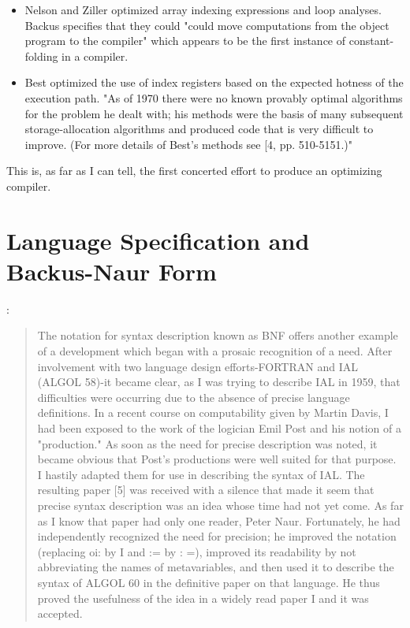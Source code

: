 \begin{itemize}
    \item Nelson and Ziller optimized array indexing expressions and loop analyses.
          Backus specifies that they could "could move computations from the object program to the compiler"
          which appears to be the first instance of constant-folding in a compiler.
    \item Best optimized the use of index registers based on the expected hotness of the execution path.
            "As of 1970 there were no known provably optimal algorithms for the problem 
            he dealt with; his methods were the basis of many subsequent storage-allocation 
            algorithms and produced code that is very difficult to improve. (For more 
            details of Best's methods see [4, pp. 510-5151.)"
\end{itemize}

This is, as far as I can tell, the first concerted effort to produce an optimizing compiler.

\section{Language Specification and Backus-Naur Form}

\cite{Backus_1980_Programming_in_America_in_1950s}:
\begin{quotation}
The notation for syntax description known as BNF offers another example of a development which began with a prosaic recognition of a need. After
involvement with two language design efforts-FORTRAN and IAL (ALGOL
58)-it became clear, as I was trying to describe IAL in 1959, that difficulties
were occurring due to the absence of precise language definitions. In a recent course on computability given by Martin Davis, I had been exposed to
the work of the logician Emil Post and his notion of a "production." As soon
as the need for precise description was noted, it became obvious that
Post's productions were well suited for that purpose. I hastily adapted them
for use in describing the syntax of IAL. The resulting paper [5] was received 
with a silence that made it seem that precise syntax description was an idea
whose time had not yet come. As far as I know that paper had only one
reader, Peter Naur. Fortunately, he had independently recognized the need
for precision; he improved the notation (replacing oi: by I and := by : =), improved its readability by not abbreviating the names of metavariables, and
then used it to describe the syntax of ALGOL 60 in the definitive paper on that
language. He thus proved the usefulness of the idea in a widely read paper I
and it was accepted. 
\end{quotation}

